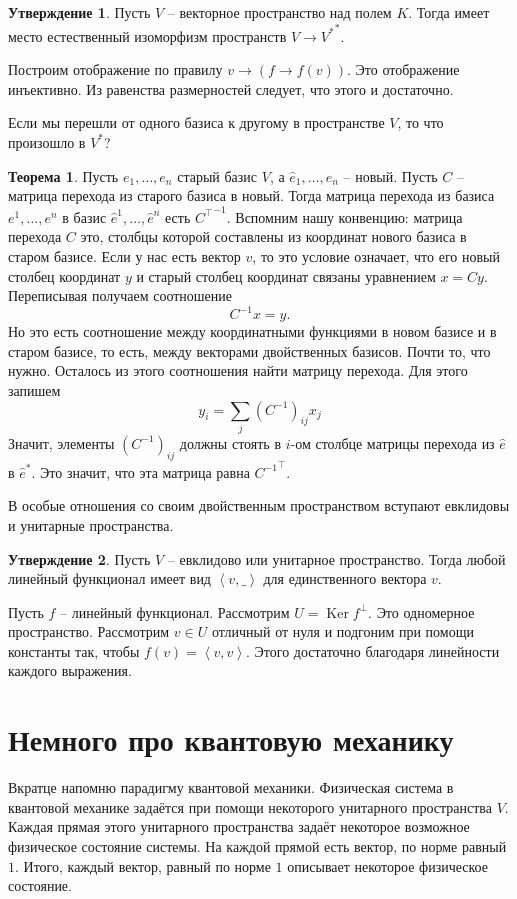 \documentclass[10pt,a4paper,oneside]{book}
\theoremstyle{definition}
\newtheorem{thm}{\color{red!40!black}Теорема}
\newtheorem{utvr}{\color{blue!50!black}Утверждение}
\DeclareMathOperator{\Ker}{Ker}
\def\lan{\left\langle }
\def\ran{\right\rangle}
\def\thrm{\begin{thm}}
\def\ethrm{\end{thm}}
\def\utv{\begin{utvr}}
\def\eutv{\end{utvr}}
\begin{document}
\utv Пусть $V$ -- векторное пространство над полем $K$. Тогда имеет место естественный изоморфизм пространств $V\to {V^*}^*$.
\eutv
\proof Построим отображение по правилу $v \to (f \to f(v))$. Это отображение инъективно. Из равенства размерностей следует, что этого и достаточно.
\endproof

Если мы перешли от одного базиса к другому в пространстве $V$, то что произошло в $V^*$? 

\thrm Пусть $e_1,\dots,e_n$ старый базис $V$, а $\hat{e}_1,\dots,\hat{e}_n$ -- новый. Пусть $C$ -- матрица перехода из старого базиса в новый. Тогда матрица перехода из базиса $e^1,\dots,e^n$ в базис $\hat{e}^1,\dots,\hat{e}^n$ есть ${C^{\top}}^{-1}$.
\proof Вспомним нашу конвенцию: матрица перехода $C$ это, столбцы которой составлены из координат нового базиса в старом базисе. Если у нас есть вектор $v$, то это условие означает, что его новый столбец координат $y$ и старый столбец координат связаны уравнением $x=Cy$. Переписывая получаем соотношение 
$$C^{-1}x=y.$$
Но это есть соотношение между координатными функциями в новом базисе и в старом базисе, то есть, между векторами двойственных базисов. Почти то, что нужно. Осталось из этого соотношения найти матрицу перехода. Для этого запишем $$y_i=\sum_j (C^{-1})_{ij}x_j$$
Значит, элементы $(C^{-1})_{ij}$ должны стоять в $i$-ом столбце матрицы перехода из $\hat{e}$ в $\hat{e}^*$. Это значит, что эта матрица равна ${C^{-1}}^{\top}$.
\endproof
\ethrm

В особые отношения со своим двойственным пространством вступают евклидовы и унитарные пространства. 

\utv Пусть $V$ -- евклидово или унитарное пространство. Тогда любой линейный функционал имеет вид $\lan v, \_ \ran$ для единственного вектора $v$. 
\eutv
\proof Пусть $f$ -- линейный функционал. Рассмотрим $U=\Ker f^\bot$. Это одномерное пространство. Рассмотрим $v\in U$ отличный от нуля и подгоним при помощи константы так, чтобы  $f(v)=\lan v,v \ran$. Этого достаточно благодаря линейности каждого выражения.  
\endproof

\section{Немного про квантовую механику}

Вкратце напомню парадигму квантовой механики. Физическая система в квантовой механике задаётся при помощи некоторого унитарного пространства $V$. Каждая прямая этого унитарного пространства задаёт некоторое возможное физическое состояние системы. На каждой прямой есть вектор, по норме равный $1$. Итого, каждый вектор, равный по норме $1$ описывает некоторое физическое состояние. 
\end{document}

